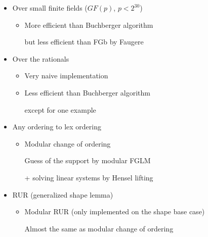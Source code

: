 \begin{slide}{}
\begin{itemize}
\item Over small finite fields ($GF(p)$, $p < 2^{30}$)
\begin{itemize}
\item More efficient than Buchberger algorithm

but less efficient than FGb by Faugere
\end{itemize}

\item Over the rationals

\begin{itemize}
\item Very naive implementation

\item Less efficient than Buchberger algorithm

except for one example
\end{itemize}

\end{itemize}
\end{slide}

\begin{slide}{}

\begin{itemize}
\item Any ordering to lex ordering

\begin{itemize}
\item Modular change of ordering

Guess of the support by modular FGLM

+ solving linear systems by Hensel lifting

\end{itemize}

\item RUR (generalized shape lemma)

\begin{itemize}
\item Modular RUR (only implemented on the shape base case)

Almost the same as modular change of ordering
\end{itemize}

\end{itemize}
\end{slide}

